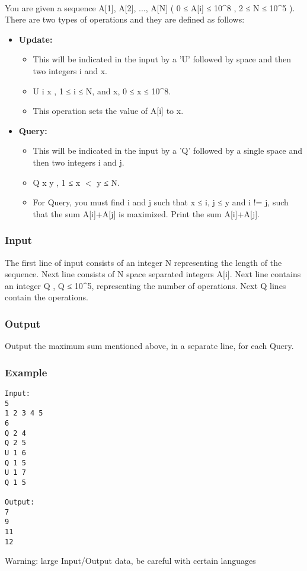 

 

You are given a sequence A[1], A[2], ..., A[N] ( 0 ≤ A[i] ≤ 10\textasciicircum8 , 2 ≤ N ≤ 10\textasciicircum5 ). There are two types of operations and they are defined as follows:
\begin{itemize}
	\item \textbf{Update: }
\begin{itemize}
	\item \textbf{​}This will be indicated in the input by a 'U' followed by space and then two integers i and x.
	\item U i x , 1 ≤ i ≤ N, and x, 0 ≤ x ≤ 10\textasciicircum8.
	\item This operation sets the value of A[i] to x.
\end{itemize}
	\item \textbf{Query:}
\begin{itemize}
	\item This will be indicated in the input by a 'Q' followed by a single space and then two integers i and j.
	\item Q x y , 1 ≤ x $<$ y ≤ N.
	\item For Query, you must find i and j such that x ≤ i, j ≤ y and i != j, such that the sum A[i]+A[j] is maximized. Print the sum A[i]+A[j].
\end{itemize}
\end{itemize}

\subsubsection{Input}

The first line of input consists of an integer N representing the length of the sequence. Next line consists of N space separated integers A[i]. Next line contains an integer Q , Q ≤ 10\textasciicircum5, representing the number of operations. Next Q lines contain the operations.

\subsubsection{Output}

Output the maximum sum mentioned above, in a separate line, for each Query.

\subsubsection{Example}
\begin{verbatim}
Input:
5
1 2 3 4 5
6
Q 2 4
Q 2 5
U 1 6
Q 1 5
U 1 7
Q 1 5

Output:
7
9
11
12

\end{verbatim}

Warning: large Input/Output data, be careful with certain languages